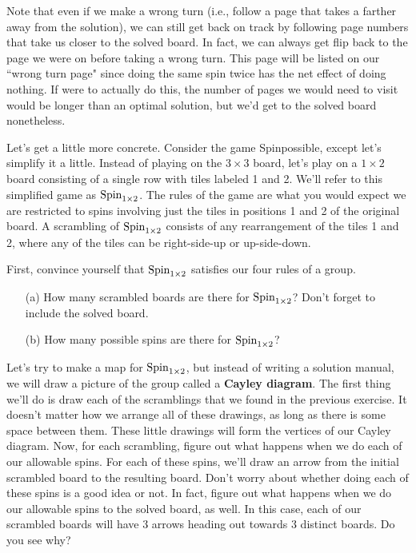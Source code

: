 Note that even if we make a wrong turn (i.e., follow a page that takes a farther away from the solution), we can still get back on track by following page numbers that take us closer to the solved board.  In fact, we can always get flip back to the page we were on before taking a wrong turn.  This page will be listed on our ``wrong turn page" since doing the same spin twice has the net effect of doing nothing.  If were to actually do this, the number of pages we would need to visit would be longer than an optimal solution, but we'd get to the solved board nonetheless.

Let's get a little more concrete.  Consider the game Spinpossible, except let's simplify it a little.  Instead of playing on the $3\times 3$ board, let's play on a $1\times 2$ board consisting of a single row with tiles labeled 1 and 2.  We'll refer to this simplified game as $\operatorname{Spin}_{1\times 2}$.  The rules of the game are what you would expect we are restricted to spins involving just the tiles in positions 1 and 2 of the original board.  A scrambling of $\operatorname{Spin}_{1\times 2}$ consists of any rearrangement of the tiles 1 and 2, where any of the tiles can be right-side-up or up-side-down.

\begin{exercise}
First, convince yourself that $\operatorname{Spin}_{1\times 2}$ satisfies our four rules of a group.
\begin{enumerate}
\item[(a)] How many scrambled boards are there for $\operatorname{Spin}_{1\times 2}$?  Don't forget to include the solved board.
\item[(b)] How many possible spins are there for $\operatorname{Spin}_{1\times 2}$?
\end{enumerate}
\end{exercise}

Let's try to make a map for $\operatorname{Spin}_{1\times 2}$, but instead of writing a solution manual, we will draw a picture of the group called a \textbf{Cayley diagram}.  The first thing we'll do is draw each of the scramblings that we found in the previous exercise.  It doesn't matter how we arrange all of these drawings, as long as there is some space between them.  These little drawings will form the vertices of our Cayley diagram.  Now, for each scrambling, figure out what happens when we do each of our allowable spins.  For each of these spins, we'll draw an arrow from the initial scrambled board to the resulting board.  Don't worry about whether doing each of these spins is a good idea or not.  In fact, figure out what happens when we do our allowable spins to the solved board, as well.  In this case, each of our scrambled boards will have 3 arrows heading out towards 3 distinct boards.  Do you see why?  

